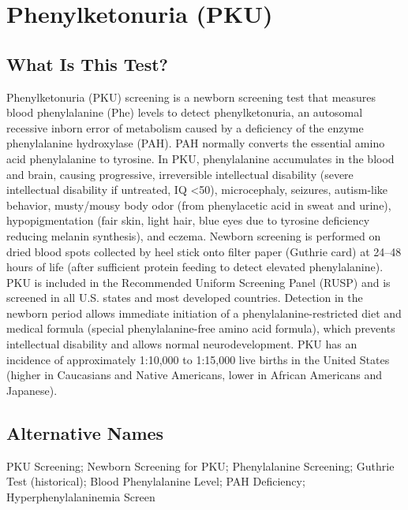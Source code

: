 \chapter{Phenylketonuria (PKU)}

\section*{What Is This Test?}
Phenylketonuria (PKU) screening is a newborn screening test that measures blood phenylalanine (Phe) levels to detect phenylketonuria, an autosomal recessive inborn error of metabolism caused by a deficiency of the enzyme phenylalanine hydroxylase (PAH). PAH normally converts the essential amino acid phenylalanine to tyrosine. In PKU, phenylalanine accumulates in the blood and brain, causing progressive, irreversible intellectual disability (severe intellectual disability if untreated, IQ <50), microcephaly, seizures, autism-like behavior, musty/mousy body odor (from phenylacetic acid in sweat and urine), hypopigmentation (fair skin, light hair, blue eyes due to tyrosine deficiency reducing melanin synthesis), and eczema. Newborn screening is performed on dried blood spots collected by heel stick onto filter paper (Guthrie card) at 24--48 hours of life (after sufficient protein feeding to detect elevated phenylalanine). PKU is included in the Recommended Uniform Screening Panel (RUSP) and is screened in all U.S. states and most developed countries. Detection in the newborn period allows immediate initiation of a phenylalanine-restricted diet and medical formula (special phenylalanine-free amino acid formula), which prevents intellectual disability and allows normal neurodevelopment. PKU has an incidence of approximately 1:10,000 to 1:15,000 live births in the United States (higher in Caucasians and Native Americans, lower in African Americans and Japanese).

\section*{Alternative Names}
PKU Screening; Newborn Screening for PKU; Phenylalanine Screening; Guthrie Test (historical); Blood Phenylalanine Level; PAH Deficiency; Hyperphenylalaninemia Screen

